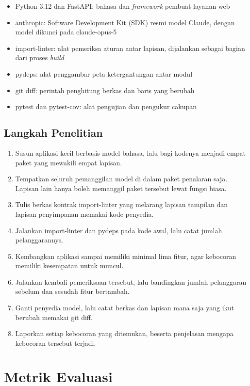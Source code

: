 \documentclass[11pt,a4paper]{article}
\begin{document}
\begin{itemize}[leftmargin=*]
  \item Python 3.12 dan FastAPI: bahasa dan \textit{framework} pembuat layanan web
  \item anthropic: Software Development Kit (SDK) resmi model Claude, dengan model dikunci pada claude-opus-5
  \item import-linter: alat pemeriksa aturan antar lapisan, dijalankan sebagai bagian dari proses \textit{build}
  \item pydeps: alat penggambar peta ketergantungan antar modul
  \item git diff: perintah penghitung berkas dan baris yang berubah
  \item pytest dan pytest-cov: alat pengujian dan pengukur cakupan
\end{itemize}

\subsection{Langkah Penelitian}

\begin{enumerate}[leftmargin=*]
  \item Susun aplikasi kecil berbasis model bahasa, lalu bagi kodenya menjadi empat paket yang mewakili empat lapisan.
  \item Tempatkan seluruh pemanggilan model di dalam paket penalaran saja. Lapisan lain hanya boleh memanggil paket tersebut lewat fungsi biasa.
  \item Tulis berkas kontrak import-linter yang melarang lapisan tampilan dan lapisan penyimpanan memakai kode penyedia.
  \item Jalankan import-linter dan pydeps pada kode awal, lalu catat jumlah pelanggarannya.
  \item Kembangkan aplikasi sampai memiliki minimal lima fitur, agar kebocoran memiliki kesempatan untuk muncul.
  \item Jalankan kembali pemeriksaan tersebut, lalu bandingkan jumlah pelanggaran sebelum dan sesudah fitur bertambah.
  \item Ganti penyedia model, lalu catat berkas dan lapisan mana saja yang ikut berubah memakai git diff.
  \item Laporkan setiap kebocoran yang ditemukan, beserta penjelasan mengapa kebocoran tersebut terjadi.
\end{enumerate}

\section{Metrik Evaluasi}
\end{document}
